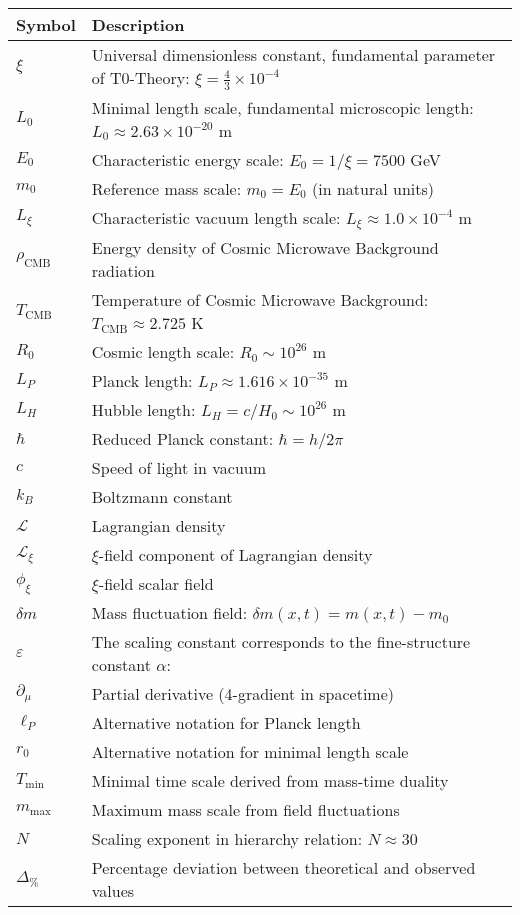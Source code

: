 \documentclass[12pt,a4paper]{article}
\numberwithin{equation}{section}
\begin{document}
\begin{longtable}{p{2cm} p{12cm}}
	\toprule
	\textbf{Symbol} & \textbf{Description} \\
	\midrule
	\endhead
	
	$\xi$ & Universal dimensionless constant, fundamental parameter of T0-Theory: $\xi = \frac{4}{3} \times 10^{-4}$ \\
	$L_0$ & Minimal length scale, fundamental microscopic length: $L_0 \approx 2.63 \times 10^{-20}$ m \\
	$E_0$ & Characteristic energy scale: $E_0 = 1/\xi = 7500$ GeV \\
	$m_0$ & Reference mass scale: $m_0 = E_0$ (in natural units) \\
	$L_\xi$ & Characteristic vacuum length scale: $L_\xi \approx 1.0 \times 10^{-4}$ m \\
	$\rho_{\text{CMB}}$ & Energy density of Cosmic Microwave Background radiation \\
	$T_{\text{CMB}}$ & Temperature of Cosmic Microwave Background: $T_{\text{CMB}} \approx 2.725$ K \\
	$R_0$ & Cosmic length scale: $R_0 \sim 10^{26}$ m \\
	$L_P$ & Planck length: $L_P \approx 1.616 \times 10^{-35}$ m \\
	$L_H$ & Hubble length: $L_H = c/H_0 \sim 10^{26}$ m \\
	$\hbar$ & Reduced Planck constant: $\hbar = h/2\pi$ \\
	$c$ & Speed of light in vacuum \\
	$k_B$ & Boltzmann constant \\
	$\mathcal{L}$ & Lagrangian density \\
	$\mathcal{L}_{\xi}$ & $\xi$-field component of Lagrangian density \\
	$\phi_\xi$ & $\xi$-field scalar field \\
	$\delta m$ & Mass fluctuation field: $\delta m(x,t) = m(x,t) - m_0$ \\
	$\varepsilon$ & The scaling constant corresponds to the fine-structure constant $\alpha$: \\
	$\partial_\mu$ & Partial derivative (4-gradient in spacetime) \\
	$\ell_P$ & Alternative notation for Planck length \\
	$r_0$ & Alternative notation for minimal length scale \\
	$T_{\text{min}}$ & Minimal time scale derived from mass-time duality \\
	$m_{\text{max}}$ & Maximum mass scale from field fluctuations \\
	$N$ & Scaling exponent in hierarchy relation: $N \approx 30$ \\
	$\Delta_{\%}$ & Percentage deviation between theoretical and observed values \\
	\bottomrule
\end{longtable}
\end{document}
